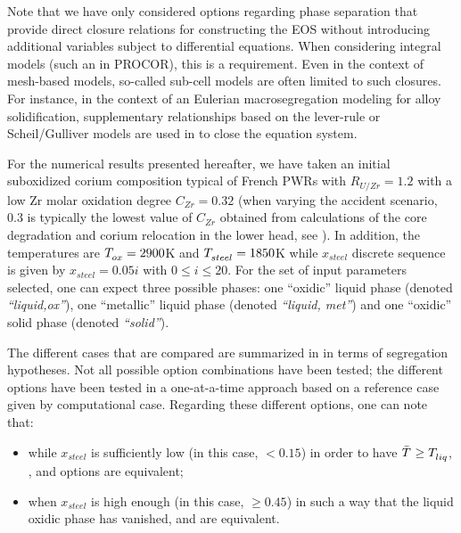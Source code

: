 Note that we have only considered options regarding phase separation that provide direct closure relations for constructing the EOS without introducing additional variables subject to differential equations. When considering integral models (such an in PROCOR), this is a requirement. Even in the context of mesh-based models, so-called sub-cell models are often limited to such closures. For instance, in the context of an Eulerian macrosegregation modeling for alloy solidification, supplementary relationships based on the lever-rule or Scheil\-/Gulliver models are used in \cite{Du2007} to close the equation system.
 
For the numerical results presented hereafter, we have taken an initial suboxidized corium composition typical of French PWRs with $R_{U/Zr}=1.2$ with a low Zr molar oxidation degree $C_{Zr}=0.32$ (when varying the accident scenario, 0.3 is typically the lowest value of $C_{Zr}$ obtained from calculations of the core degradation and corium relocation in the lower head, see \cite{Seiler2014}). In addition, the temperatures are $\temperature{ox}=2900$K and $\temperature{steel}=1850$K while $x_{steel}$ discrete sequence is given by $x_{steel} = 0.05i$ with $0 \le i \le 20$. For the set of input parameters selected, one can expect three possible phases: one ``oxidic'' liquid phase (denoted \textit{``liquid,ox''}), one ``metallic'' liquid phase (denoted \textit{``liquid, met''}) and one ``oxidic'' solid phase (denoted \textit{``solid''}).

The different cases that are compared are summarized in  in terms of segregation hypotheses. Not all possible option combinations have been tested; the different options have been tested in a one-at-a-time approach based on a reference case given by  computational case. Regarding these different options, one can note that:
\begin{itemize}
 \item while $x_{steel}$ is sufficiently low (in this case, $< 0.15$) in order to have $\bar{\temperature{}} \ge \temperature{liq}$, ,  and  options are equivalent;
 \item when $x_{steel}$ is high enough (in this case, $\ge 0.45$) in such a way that the liquid oxidic phase has vanished,  and  are equivalent.
\end{itemize}

